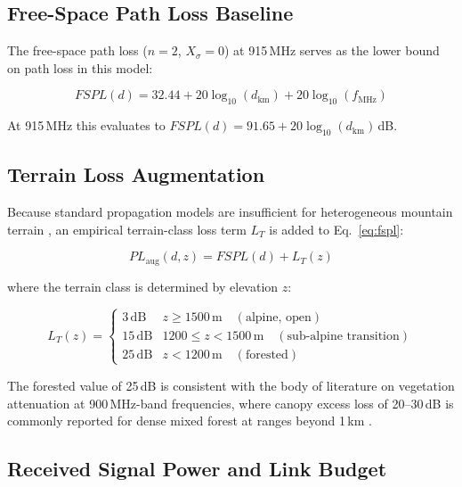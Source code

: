 \documentclass[11pt,letterpaper]{article}
\begin{document}
\subsection{Free-Space Path Loss Baseline}

The free-space path loss ($n = 2$, $X_\sigma = 0$) at 915\,MHz serves as the lower
bound on path loss in this model:

\begin{equation}
  FSPL(d) = 32.44 + 20\log_{10}(d_{\mathrm{km}}) + 20\log_{10}(f_{\mathrm{MHz}})
  \label{eq:fspl}
\end{equation}

At 915\,MHz this evaluates to $FSPL(d) = 91.65 + 20\log_{10}(d_{\mathrm{km}})$\,dB.

\subsection{Terrain Loss Augmentation}

Because standard propagation models are insufficient for heterogeneous mountain terrain
\cite{review2024}, an empirical terrain-class loss term $L_T$ is added to
Eq.~\eqref{eq:fspl}:

\begin{equation}
  PL_{\mathrm{aug}}(d, z) = FSPL(d) + L_T(z)
\end{equation}

where the terrain class is determined by elevation $z$:

\begin{equation}
  L_T(z) =
  \begin{cases}
    3\,\mathrm{dB}  & z \geq 1500\,\mathrm{m} \quad (\text{alpine, open}) \\
    15\,\mathrm{dB} & 1200 \leq z < 1500\,\mathrm{m} \quad (\text{sub-alpine transition}) \\
    25\,\mathrm{dB} & z < 1200\,\mathrm{m} \quad (\text{forested})
  \end{cases}
  \label{eq:terrain}
\end{equation}

The forested value of 25\,dB is consistent with the body of literature on
vegetation attenuation at 900\,MHz-band frequencies, where canopy excess loss of
20--30\,dB is commonly reported for dense mixed forest at ranges beyond 1\,km
\cite{review2024}.

\subsection{Received Signal Power and Link Budget}
\end{document}
